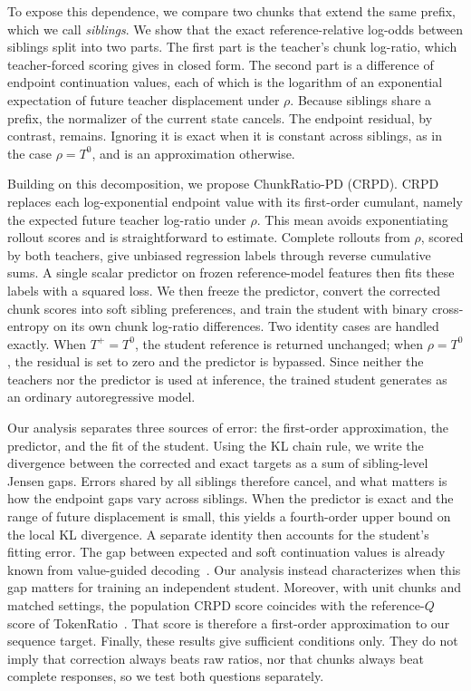 \documentclass[pdflatex,sn-mathphys-num,review]{sn-jnl}
\theoremstyle{thmstyleone}
\theoremstyle{thmstyletwo}
\theoremstyle{thmstylethree}
\providecommand{\Tp}{T^{+}}
\providecommand{\Tz}{T^{0}}
\begin{document}
To expose this dependence, we compare two chunks that extend the same prefix, which we call \emph{siblings}. We show that the exact reference-relative log-odds between siblings split into two parts. The first part is the teacher's chunk log-ratio, which teacher-forced scoring gives in closed form. The second part is a difference of endpoint continuation values, each of which is the logarithm of an exponential expectation of future teacher displacement under $\rho$. Because siblings share a prefix, the normalizer of the current state cancels. The endpoint residual, by contrast, remains. Ignoring it is exact when it is constant across siblings, as in the case $\rho=\Tz$, and is an approximation otherwise.

Building on this decomposition, we propose ChunkRatio-PD (CRPD). CRPD replaces each log-exponential endpoint value with its first-order cumulant, namely the expected future teacher log-ratio under $\rho$. This mean avoids exponentiating rollout scores and is straightforward to estimate. Complete rollouts from $\rho$, scored by both teachers, give unbiased regression labels through reverse cumulative sums. A single scalar predictor on frozen reference-model features then fits these labels with a squared loss. We then freeze the predictor, convert the corrected chunk scores into soft sibling preferences, and train the student with binary cross-entropy on its own chunk log-ratio differences. Two identity cases are handled exactly. When $\Tp=\Tz$, the student reference is returned unchanged; when $\rho=\Tz$, the residual is set to zero and the predictor is bypassed. Since neither the teachers nor the predictor is used at inference, the trained student generates as an ordinary autoregressive model.

Our analysis separates three sources of error: the first-order approximation, the predictor, and the fit of the student. Using the KL chain rule, we write the divergence between the corrected and exact targets as a sum of sibling-level Jensen gaps. Errors shared by all siblings therefore cancel, and what matters is how the endpoint gaps vary across siblings. When the predictor is exact and the range of future displacement is small, this yields a fourth-order upper bound on the local KL divergence. A separate identity then accounts for the student's fitting error. The gap between expected and soft continuation values is already known from value-guided decoding~\citep{mudgal2024controlled,zhou2025qsharp}. Our analysis instead characterizes when this gap matters for training an independent student. Moreover, with unit chunks and matched settings, the population CRPD score coincides with the reference-$Q$ score of TokenRatio~\citep{nguyen2026tokenratio}. That score is therefore a first-order approximation to our sequence target. Finally, these results give sufficient conditions only. They do not imply that correction always beats raw ratios, nor that chunks always beat complete responses, so we test both questions separately.
\end{document}
